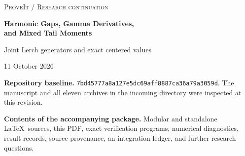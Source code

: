 \documentclass[11pt,letterpaper]{article}
\numberwithin{equation}{section}
\theoremstyle{plain}
\theoremstyle{definition}
\theoremstyle{remark}
\newcommand{\src}[1]{\nolinkurl{#1}}
\begin{document}
\hypersetup{pageanchor=false}
\begin{titlepage}
\thispagestyle{empty}
{\color{ink}\small\textsc{ProveIt \quad / \quad Research continuation}\par}
\vspace{1.1cm}
{\color{ink}\huge\bfseries Harmonic Gaps, Gamma Derivatives,\\[5pt]
and Mixed Tail Moments\par}
\vspace{0.45cm}
{\Large Joint Lerch generators and exact centered values\par}
\vspace{0.8cm}
{\large 11 October 2026\par}
\vspace{0.5cm}
\noindent\textbf{Repository baseline.}\quad
\src{7bd45777a8a127e5dc69aff8887ca36a79a3059d}.
The manuscript and all eleven archives in the incoming directory were
inspected at this revision.
\vspace{0.7cm}

\begin{abstract}
We address three connected questions in the newest harmonic-parity report.
First, arbitrary zero blocks around any finite number of independently
moving harmonic orders admit one jointly entire multiple-Lerch completion.
A confluent divided-difference kernel gives a common tube of holomorphy;
the complete decoration series converges on the unit polydisc, independently
of the number of free orders. Second, a derivative transverse to a
nonpositive harmonic index is represented by an explicit convergent
logarithmic Mellin integral and by a finite difference of decorated
lower-depth sums. At a zero index the first new gap is a log-Gamma
difference; higher derivatives give normalized Stieltjes primitives.
All derivative orders, all nonpositive centers, and arbitrary unmarked
nonpositive decorations are included. Third, every centered even moment
of a product of two even-order Hurwitz tails is evaluated by a finite
Bernoulli formula. Classical odd-weight Euler reduction puts the values
in an explicit finite span of ordinary zeta products. One analytic
generating function produces the entire moment family and has finite
polylogarithmic primitives.

The underlying harmonic interpolant, its untwisted geometric kernel, and
the classical Euler and Hurwitz identities are credited to their sources.
The contribution is the stated extension of the repository's exact
questions, not a claim of literature-wide priority. Proofs are separated
from exact finite checks and high-precision diagnostics. The Gaussian
$S_6$ and revised $S_8$ evaluations remain conjectural.
\end{abstract}
\vfill
\noindent\small
\textbf{Contents of the accompanying package.}
Modular and standalone \LaTeX\ sources, this PDF, exact verification
programs, numerical diagnostics, result records, source provenance,
an integration ledger, and further research questions.
\end{titlepage}
\hypersetup{pageanchor=true}
\tableofcontents
\clearpage
{}
\end{document}

